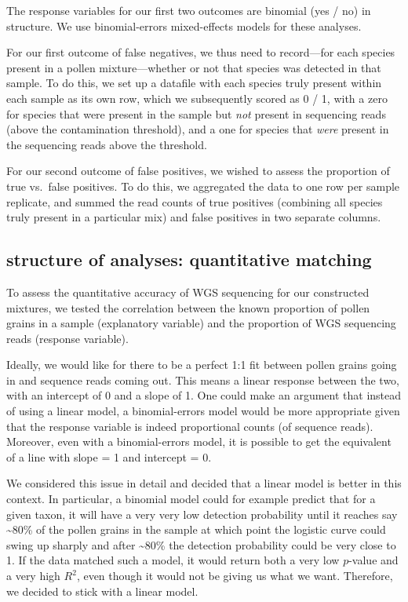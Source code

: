 \documentclass[
]{article}
\begin{document}
The response variables for our first two outcomes are binomial (yes /
no) in structure. We use binomial-errors mixed-effects models for these
analyses.

For our first outcome of false negatives, we thus need to record---for
each species present in a pollen mixture---whether or not that species
was detected in that sample. To do this, we set up a datafile with each
species truly present within each sample as its own row, which we
subsequently scored as 0 / 1, with a zero for species that were present
in the sample but \emph{not} present in sequencing reads (above the
contamination threshold), and a one for species that \emph{were} present
in the sequencing reads above the threshold.

For our second outcome of false positives, we wished to assess the
proportion of true vs.~false positives. To do this, we aggregated the
data to one row per sample replicate, and summed the read counts of true
positives (combining all species truly present in a particular mix) and
false positives in two separate columns.

\hypertarget{structure-of-analyses-quantitative-matching}{%
\subsection{structure of analyses: quantitative
matching}\label{structure-of-analyses-quantitative-matching}}

To assess the quantitative accuracy of WGS sequencing for our
constructed mixtures, we tested the correlation between the known
proportion of pollen grains in a sample (explanatory variable) and the
proportion of WGS sequencing reads (response variable).

Ideally, we would like for there to be a perfect 1:1 fit between pollen
grains going in and sequence reads coming out. This means a linear
response between the two, with an intercept of 0 and a slope of 1. One
could make an argument that instead of using a linear model, a
binomial-errors model would be more appropriate given that the response
variable is indeed proportional counts (of sequence reads). Moreover,
even with a binomial-errors model, it is possible to get the equivalent
of a line with slope = 1 and intercept = 0.

We considered this issue in detail and decided that a linear model is
better in this context. In particular, a binomial model could for
example predict that for a given taxon, it will have a very very low
detection probability until it reaches say \textasciitilde80\% of the
pollen grains in the sample at which point the logistic curve could
swing up sharply and after \textasciitilde80\% the detection probability
could be very close to 1. If the data matched such a model, it would
return both a very low \(p\)-value and a very high \(R^2\), even though
it would not be giving us what we want. Therefore, we decided to stick
with a linear model.
\end{document}
